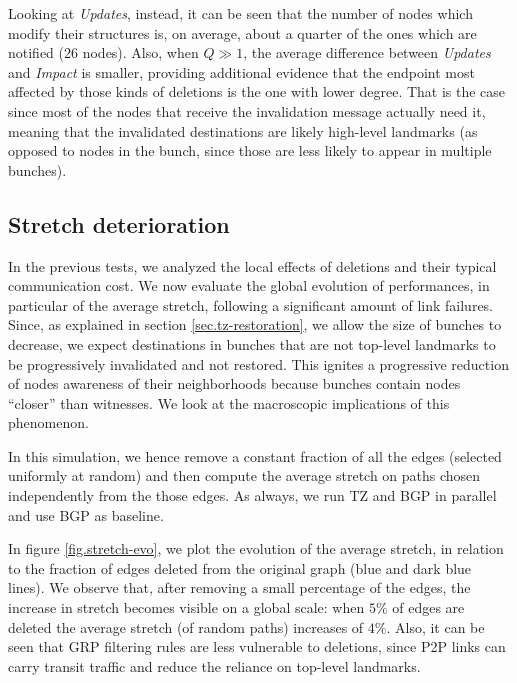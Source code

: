 \documentclass[a4paper,11pt,oneside]{report}
\begin{document}
Looking at \textit{Updates}, instead, it can be seen that the number of nodes which modify their structures is, on average, about a quarter of the ones which are notified ($26$ nodes). Also, when $Q \gg 1$, the average difference between \textit{Updates} and \textit{Impact} is smaller, providing additional evidence that the endpoint most affected by those kinds of deletions is the one with lower degree. That is the case since most of the nodes that receive the invalidation message actually need it, meaning that the invalidated destinations are likely high-level landmarks (as opposed to nodes in the bunch, since those are less likely to appear in multiple bunches).

\subsection{Stretch deterioration}
\label{sec.stretch-baseline}
In the previous tests, we analyzed the local effects of deletions and their typical communication cost. We now evaluate the global evolution of performances, in particular of the average stretch, following a significant amount of link failures. Since, as explained in section \ref{sec.tz-restoration}, we allow the size of bunches to decrease, we expect destinations in bunches that are not top-level landmarks to be progressively invalidated and not restored. This ignites a progressive reduction of nodes awareness of their neighborhoods because bunches contain nodes ``closer'' than witnesses. We look at the macroscopic implications of this phenomenon.

In this simulation, we hence remove a constant fraction of all the edges (selected uniformly at random) and then compute the average stretch on paths chosen independently from the those edges. As always, we run TZ and BGP in parallel and use BGP as baseline. 

In figure \ref{fig.stretch-evo}, we plot the evolution of the average stretch, in relation to the fraction of edges deleted from the original graph (blue and dark blue lines). 
We observe that, after removing a small percentage of the edges, the increase in stretch becomes visible on a global scale: when $5\%$ of edges are deleted the average stretch (of random paths) increases of $4\%$. Also, it can be seen that GRP filtering rules are less vulnerable to deletions, since P2P links can carry transit traffic and reduce the reliance on top-level landmarks.
\end{document}
